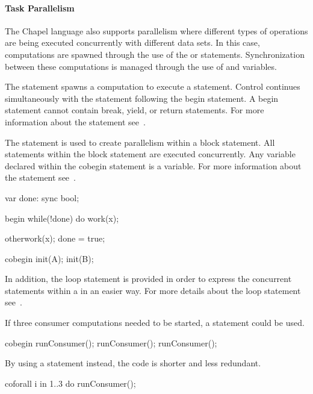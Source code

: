 \paragraph{Task Parallelism}
The Chapel language also supports parallelism where different types of
operations are being executed concurrently with different data sets.
In this case, computations are spawned through the use of the 
or  statements.  Synchronization between these computations
is managed through the use of  and
 variables.

The  statement spawns a computation to execute a
statement. Control continues simultaneously with the statement following
the begin statement.  A begin statement cannot contain break,
yield, or return statements.  For more information about the 
statement see~. 

The  statement is used to create parallelism within
a block statement.  All statements within the block statement
are executed concurrently.  Any variable declared within the cobegin
statement is a  variable.  For more information about
the  statement see~.

\begin{example}
\begin{chapel}
var done: sync bool;
 
begin 
  while(!done) do work(x);

otherwork(x);
done = true;

cobegin {
  init(A);
  init(B);
}
\end{chapel}
\end{example}

In addition, the  loop statement is provided in order
to express the concurrent statements within a  in an
easier way.  For more details about the  loop statement
see~.

\begin{example}
If three consumer computations needed to be started, a 
statement could be used.
\begin{chapel}
cobegin {
  runConsumer();
  runConsumer();
  runConsumer();
}
\end{chapel}

By using a  statement instead, the code is shorter
and less redundant.
\begin{chapel}
coforall i in 1..3 do
  runConsumer();
\end{chapel}
\end{example}

